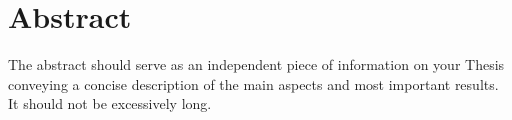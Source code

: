 
\chapter{Abstract}

The abstract should serve as an independent piece of information on your Thesis conveying a concise description of the main aspects and most important results.
It should not be excessively long.
